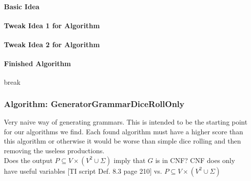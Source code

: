 \paragraph{Basic Idea}

\paragraph{Tweak Idea 1 for Algorithm}

\paragraph{Tweak Idea 2 for Algorithm}

\paragraph{Finished Algorithm}
break
\pagebreak
\subsubsection{Algorithm: GeneratorGrammarDiceRollOnly}
\noindent Very naive way of generating grammars. This is intended to be the starting point for our algorithms we find. Each found algorithm must have a higher score than this algorithm or otherwise it would be worse than simple dice rolling and then removing the useless productions.\\

\noindent
{}
Does the output $P \subseteq V \times (V^{2} \cup \Sigma)$ imply that $G$ is in CNF? CNF does only have useful variables [TI script Def. 8.3 page 210] vs. $P \subseteq V \times (V^{2} \cup \Sigma)$\\
%		
\pagebreak
 
